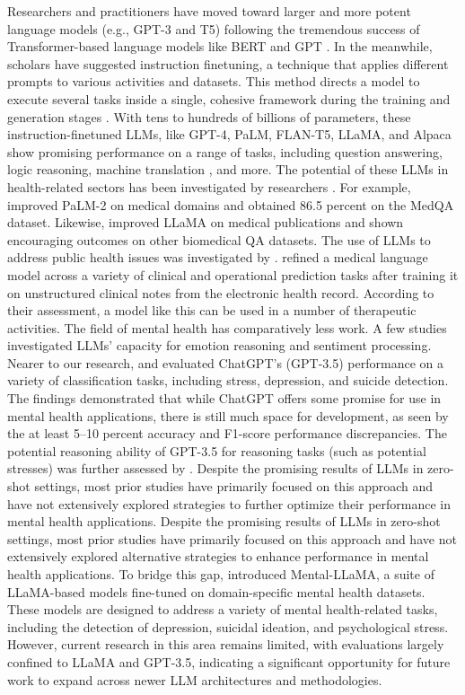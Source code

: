 Researchers and practitioners have moved toward larger and more potent language models (e.g., GPT-3 and T5) following the tremendous success of Transformer-based language models like BERT \cite{devlin2019bert} and GPT \cite{Radford2018}. In the meanwhile, scholars have suggested instruction finetuning, a technique that applies different prompts to various activities and datasets. This method directs a model to execute several tasks inside a single, cohesive framework during the training and generation stages \cite{wei2022finetuned}. With tens to hundreds of billions of parameters, these instruction-finetuned LLMs, like GPT-4, PaLM, FLAN-T5, LLaMA, and Alpaca show promising performance on a range of tasks, including question answering, logic reasoning, machine translation \cite{brants2007large}, and more. The potential of these LLMs in health-related sectors has been investigated by researchers \cite{jiang2023health}. For example, \cite{singhal2023towards} improved PaLM-2 on medical domains and obtained 86.5 percent on the MedQA dataset. Likewise, \cite{Wu2019} improved LLaMA on medical publications and shown encouraging outcomes on other biomedical QA datasets. The use of LLMs to address public health issues was investigated by \cite{jo2023understanding}. \cite{jiang2023health} refined a medical language model across a variety of clinical and operational prediction tasks after training it on unstructured clinical notes from the electronic health record. According to their assessment, a model like this can be used in a number of therapeutic activities. The field of mental health has comparatively less work. A few studies investigated LLMs' capacity for emotion reasoning and sentiment processing. Nearer to our research, \cite{lamichhane2023evaluation} and \cite{amin2023affective} evaluated ChatGPT's (GPT-3.5) performance on a variety of classification tasks, including stress, depression, and suicide detection. The findings demonstrated that while ChatGPT offers some promise for use in mental health applications, there is still much space for development, as seen by the at least 5–10 percent accuracy and F1-score performance discrepancies. The potential reasoning ability of GPT-3.5 for reasoning tasks (such as potential stresses) was further assessed by \cite{yang2023evaluations}. Despite the promising results of LLMs in zero-shot settings, most prior studies have primarily focused on this approach and have not extensively explored strategies to further optimize their performance in mental health applications. Despite the promising results of LLMs in zero-shot settings, most prior studies have primarily focused on this approach and have not extensively explored alternative strategies to enhance performance in mental health applications. To bridge this gap, \cite{yang2023mental} introduced Mental-LLaMA, a suite of LLaMA-based models fine-tuned on domain-specific mental health datasets. These models are designed to address a variety of mental health-related tasks, including the detection of depression, suicidal ideation, and psychological stress. However, current research in this area remains limited, with evaluations largely confined to LLaMA and GPT-3.5, indicating a significant opportunity for future work to expand across newer LLM architectures and methodologies.